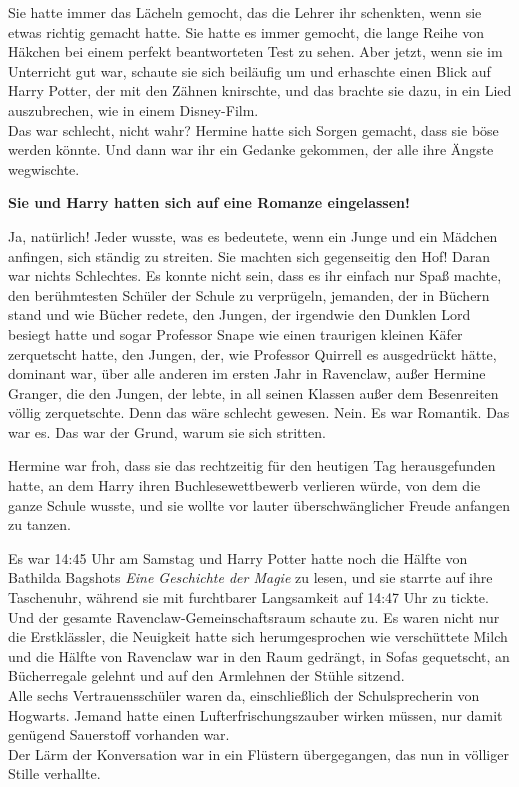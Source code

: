 {Sie hatte immer das Lächeln gemocht, das die Lehrer ihr schenkten, wenn sie etwas richtig gemacht hatte. Sie hatte es immer gemocht, die lange Reihe von Häkchen bei einem perfekt beantworteten Test zu sehen. Aber jetzt, wenn sie im Unterricht gut war, schaute sie sich beiläufig um und erhaschte einen Blick auf Harry Potter, der mit den Zähnen knirschte, und das brachte sie dazu, in ein Lied auszubrechen, wie in einem Disney-Film.\\ Das war schlecht, nicht wahr? Hermine hatte sich Sorgen gemacht, dass sie böse werden könnte. Und dann war ihr ein Gedanke gekommen, der alle ihre Ängste wegwischte.

\textbf{Sie und Harry hatten sich auf eine Romanze eingelassen!}

Ja, natürlich! Jeder wusste, was es bedeutete, wenn ein Junge und ein Mädchen anfingen, sich ständig zu streiten. Sie machten sich gegenseitig den Hof! Daran war nichts Schlechtes. Es konnte nicht sein, dass es ihr einfach nur Spaß machte, den berühmtesten Schüler der Schule zu verprügeln, jemanden, der in Büchern stand und wie Bücher redete, den Jungen, der irgendwie den Dunklen Lord besiegt hatte und sogar Professor Snape wie einen traurigen kleinen Käfer zerquetscht hatte, den Jungen, der, wie Professor Quirrell es ausgedrückt hätte, dominant war, über alle anderen im ersten Jahr in Ravenclaw, außer Hermine Granger, die den Jungen, der lebte, in all seinen Klassen außer dem Besenreiten völlig zerquetschte. Denn das wäre schlecht gewesen. Nein. Es war Romantik. Das war es. Das war der Grund, warum sie sich stritten.

Hermine war froh, dass sie das rechtzeitig für den heutigen Tag herausgefunden hatte, an dem Harry ihren Buchlesewettbewerb verlieren würde, von dem die ganze Schule wusste, und sie wollte vor lauter überschwänglicher Freude anfangen zu tanzen.

Es war 14:45 Uhr am Samstag und Harry Potter hatte noch die Hälfte von Bathilda Bagshots \emph{Eine Geschichte der Magie} zu lesen, und sie starrte auf ihre Taschenuhr, während sie mit furchtbarer Langsamkeit auf 14:47 Uhr zu tickte.\\ Und der gesamte Ravenclaw-Gemeinschaftsraum schaute zu. Es waren nicht nur die Erstklässler, die Neuigkeit hatte sich herumgesprochen wie verschüttete Milch und die Hälfte von Ravenclaw war in den Raum gedrängt, in Sofas gequetscht, an Bücherregale gelehnt und auf den Armlehnen der Stühle sitzend.\\ Alle sechs Vertrauensschüler waren da, einschließlich der Schulsprecherin von Hogwarts. Jemand hatte einen Lufterfrischungszauber wirken müssen, nur damit genügend Sauerstoff vorhanden war.\\ Der Lärm der Konversation war in ein Flüstern übergegangen, das nun in völliger Stille verhallte.

}
